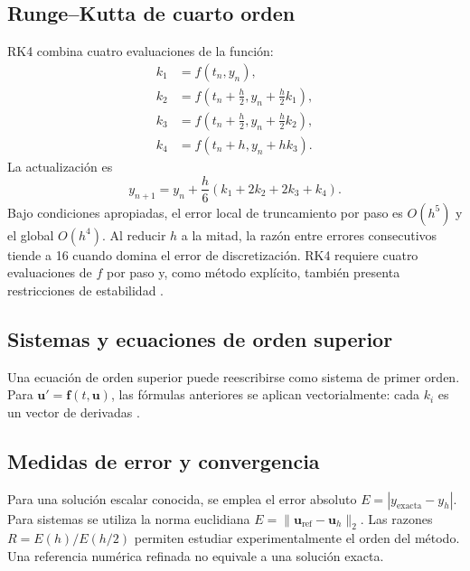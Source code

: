 \documentclass[12pt,letterpaper]{article}
\begin{document}
\subsection{Runge--Kutta de cuarto orden}
RK4 combina cuatro evaluaciones de la función:
\begin{align}
k_1&=f(t_n,y_n),\\
k_2&=f\left(t_n+\frac h2,y_n+\frac h2k_1\right),\\
k_3&=f\left(t_n+\frac h2,y_n+\frac h2k_2\right),\\
k_4&=f(t_n+h,y_n+hk_3).
\end{align}
La actualización es
\begin{equation}\boxed{y_{n+1}=y_n+\frac h6(k_1+2k_2+2k_3+k_4).}\end{equation}
Bajo condiciones apropiadas, el error local de truncamiento por paso es $O(h^5)$ y el global $O(h^4)$. Al reducir $h$ a la mitad, la razón entre errores consecutivos tiende a 16 cuando domina el error de discretización. RK4 requiere cuatro evaluaciones de $f$ por paso y, como método explícito, también presenta restricciones de estabilidad \cite[sec.~9.2]{zill2009}.
\subsection{Sistemas y ecuaciones de orden superior}
Una ecuación de orden superior puede reescribirse como sistema de primer orden. Para $\mathbf{u}'=\mathbf{f}(t,\mathbf{u})$, las fórmulas anteriores se aplican vectorialmente: cada $k_i$ es un vector de derivadas \cite[sec.~9.4]{zill2009}.
\subsection{Medidas de error y convergencia}
Para una solución escalar conocida, se emplea el error absoluto $E=|y_{\mathrm{exacta}}-y_h|$. Para sistemas se utiliza la norma euclidiana $E=\|\mathbf{u}_{\mathrm{ref}}-\mathbf{u}_h\|_2$. Las razones $R=E(h)/E(h/2)$ permiten estudiar experimentalmente el orden del método. Una referencia numérica refinada no equivale a una solución exacta.
\end{document}
